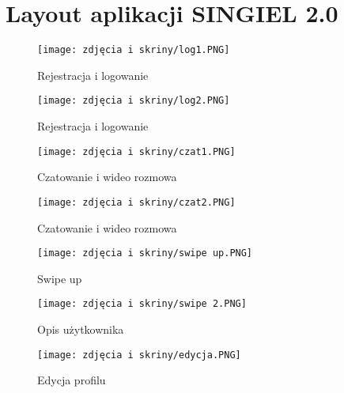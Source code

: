 \documentclass[12pt,a4paper]{article}
\begin{document}
\section{Layout aplikacji SINGIEL 2.0}
\begin{figure}[h]
\centering
\texttt{[image: zdjęcia i skriny/log1.PNG]}
\caption{Rejestracja i logowanie}
\end{figure}

\begin{figure}[h]
\centering
\texttt{[image: zdjęcia i skriny/log2.PNG]}
\caption{Rejestracja i logowanie}
\end{figure}

\begin{figure}[htbp]
\centering
\texttt{[image: zdjęcia i skriny/czat1.PNG]}
\caption{Czatowanie i wideo rozmowa}
\end{figure}

\begin{figure}[htbp]
\centering
\texttt{[image: zdjęcia i skriny/czat2.PNG]}
\caption{Czatowanie i wideo rozmowa}
\end{figure}
\begin{figure}[htbp]
\centering
\texttt{[image: zdjęcia i skriny/swipe up.PNG]}
\caption{Swipe up}
\end{figure}

\begin{figure}[h]
\centering
\texttt{[image: zdjęcia i skriny/swipe 2.PNG]}
\caption{Opis użytkownika}
\end{figure}


\begin{figure}[h]
\centering
\texttt{[image: zdjęcia i skriny/edycja.PNG]}
\caption{Edycja profilu}
\end{figure}
\end{document}
